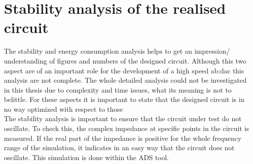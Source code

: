 \section{Stability analysis of the realised circuit}
The stability and energy consumption analysis helps to get an impression/ understanding of figures and numbers of the designed circuit. Although this two aspect are of an important role for the development of a high speed \gls{ab:dac} this analysis are not complete. The whole detailed analysis could not be investigated in this thesis due to complexity and time issues, what its meaning is not to belittle. For these aspects it is important to state that the designed circuit is in no way optimized with respect to those \\
The stability analysis is important to ensure that the circuit under test do not oscillate. 
 To check this, the complex impedance at specific points in the circuit is measured.
 If the real part of the impedance is positive for the whole frequency range of the simulation, it indicates in an easy way that the circuit does not oscillate.
This simulation is done within the ADS tool. 

